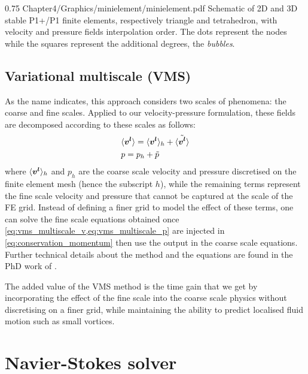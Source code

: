 \begin{figureth}
{0.75}
{Chapter4/Graphics/minielement/minielement.pdf}
{Schematic of 2D and 3D stable P1+/P1 finite elements, respectively triangle and tetrahedron, with velocity and pressure fields interpolation order.
The dots represent the nodes while the squares represent the additional degrees, the \emph{bubbles}. }
\label{fig:minielement}
\end{figureth}

\subsection{Variational multiscale (VMS)}
As the name indicates, this approach considers two scales of phenomena: the coarse and fine scales. Applied to our velocity-pressure
formulation, these fields are decomposed according to these scales as follows:
\begin{align}
\label{eq:vms_multiscale_v}
 &\langle \boldsymbol{v^l} \rangle = \langle \boldsymbol{v^l} \rangle_h + \tilde{\langle \boldsymbol{v^l} \rangle} \\ 
\label{eq:vms_multiscale_p}
 &p = p_h + \tilde{p}
\end{align}
where $\langle \boldsymbol{v^l} \rangle_h$ and $p_h$ are the coarse scale velocity and pressure discretised on the finite element mesh (hence the subscript $h$), 
while the remaining terms represent the fine scale velocity and pressure that cannot be captured at the scale of the FE grid. Instead 
of defining a finer grid to model the effect of these terms, one can solve the fine scale equations obtained once \cref{eq:vms_multiscale_v,eq:vms_multiscale_p}
are injected in \cref{eq:conservation_momentum} then use the output in the coarse scale equations. 
Further technical details about the method and the equations are found in the PhD work of \citet{hachem_stabilized_2009}. 

The added value of the VMS method is the time gain that we get 
by incorporating the effect of the fine scale into the 
coarse scale physics without discretising on a finer grid, 
while maintaining the ability to predict localised fluid motion such as small vortices.

\section{Navier-Stokes solver}

